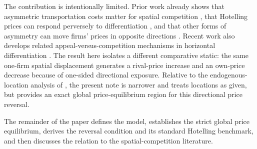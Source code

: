 The contribution is intentionally limited. Prior work already shows that asymmetric transportation costs matter for spatial competition \citep{Nilssen1997,VanderWeijdeVerhoefVandenBerg2014}, that Hotelling prices can respond perversely to differentiation \citep{MerelSexton2010}, and that other forms of asymmetry can move firms' prices in opposite directions \citep{CohenHeifetz2024}. Recent work also develops related appeal-versus-competition mechanisms in horizontal differentiation \citep{ChakravortySappington2026}. The result here isolates a different comparative static: the same one-firm spatial displacement generates a rival-price increase and an own-price decrease because of one-sided directional exposure. Relative to the endogenous-location analysis of \citet{Ago2023}, the present note is narrower and treats locations as given, but provides an exact global price-equilibrium region for this directional price reversal.

The remainder of the paper defines the model, establishes the strict global price equilibrium, derives the reversal condition and its standard Hotelling benchmark, and then discusses the relation to the spatial-competition literature.